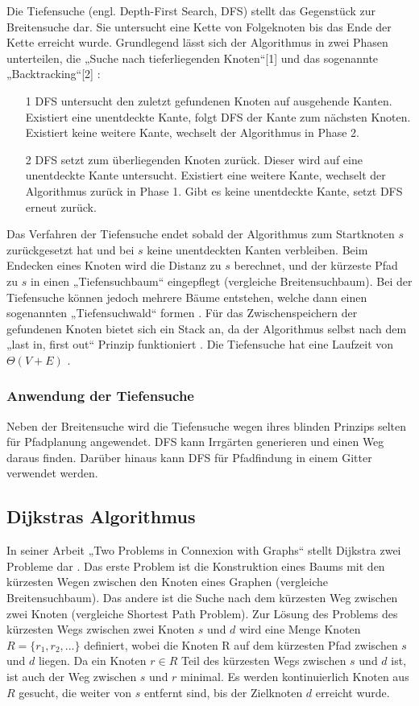Die Tiefensuche (engl. Depth-First Search, DFS) stellt das Gegenstück zur Breitensuche dar. Sie untersucht eine Kette von Folgeknoten bis das Ende der Kette erreicht wurde. Grundlegend lässt sich der Algorithmus in zwei Phasen unterteilen, die „Suche nach tieferliegenden Knoten“[1] und das sogenannte „Backtracking“[2] \cite{Tarjan.1972}:
\begin{itemize}
	\item[1] DFS untersucht den zuletzt gefundenen Knoten auf ausgehende Kanten. Existiert eine unentdeckte Kante, folgt DFS der Kante zum nächsten Knoten. Existiert keine weitere Kante, wechselt der Algorithmus in Phase 2.
	\item[2] DFS setzt zum überliegenden Knoten zurück. Dieser wird auf eine unentdeckte Kante untersucht. Existiert eine weitere Kante, wechselt der Algorithmus zurück in Phase 1. Gibt es keine unentdeckte Kante, setzt DFS erneut zurück.
\end{itemize}
Das Verfahren der Tiefensuche endet sobald der Algorithmus zum Startknoten $s$ zurückgesetzt hat und bei $s$ keine unentdeckten Kanten verbleiben. Beim Endecken eines Knoten wird die Distanz zu $s$ berechnet, und der kürzeste Pfad zu $s$ in einen „Tiefensuchbaum“ eingepflegt (vergleiche Breitensuchbaum). Bei der Tiefensuche können jedoch mehrere Bäume entstehen, welche dann einen sogenannten „Tiefensuchwald“ formen \cite{Cormen.2009}. 
Für das Zwischenspeichern der gefundenen Knoten bietet sich ein Stack an, da der Algorithmus selbst nach dem „last in, first out“ Prinzip funktioniert \cite{Tarjan.1972}. Die Tiefensuche hat eine Laufzeit von $\Theta(V + E)$ \cite{Cormen.2009}.


\subsubsection{Anwendung der Tiefensuche}
Neben der Breitensuche wird die Tiefensuche wegen ihres blinden Prinzips selten für Pfadplanung angewendet. DFS kann Irrgärten generieren und einen Weg daraus finden\cite{examMaze}. Darüber hinaus kann DFS für Pfadfindung in einem Gitter verwendet werden\cite{compare}. %


\subsection{Dijkstras Algorithmus}
In seiner Arbeit „Two Problems in Connexion with Graphs“ stellt Dijkstra zwei Probleme dar \cite{Dijkstra.1959}. Das erste Problem ist die Konstruktion eines Baums mit den kürzesten Wegen zwischen den Knoten eines Graphen (vergleiche Breitensuchbaum). Das andere ist die Suche nach dem kürzesten Weg zwischen zwei Knoten (vergleiche Shortest Path Problem).
Zur Lösung des Problems des kürzesten Wegs zwischen zwei Knoten $s$ und $d$ wird eine Menge Knoten $R = \{r_1, r_2, ...\}$ definiert, wobei die Knoten R auf dem kürzesten Pfad zwischen $s$ und $d$ liegen. %
Da ein Knoten $r \in R$ Teil des kürzesten Wegs zwischen $s$ und $d$ ist, ist auch der Weg zwischen $s$ und $r$ minimal. Es werden kontinuierlich Knoten aus $R$ gesucht, die weiter von $s$ entfernt sind, bis der Zielknoten $d$ erreicht wurde.

